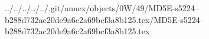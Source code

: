../../../../../.git/annex/objects/0W/49/MD5E-s5224--b288d732ac20de9a6c2a69bcf3a8b125.tex/MD5E-s5224--b288d732ac20de9a6c2a69bcf3a8b125.tex